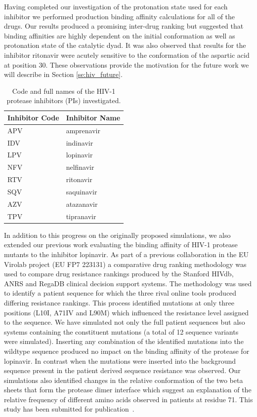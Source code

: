 \documentclass[a4paper,11pt]{article}
\begin{document}
Having completed our investigation 
of the protonation state used for each inhibitor we performed production binding affinity calculations 
for all of the drugs. Our results produced a promising inter-drug ranking but 
suggested that binding affinities are highly dependent on the initial conformation as well as protonation 
state of the catalytic dyad. It was also observed that results for the inhibitor ritonavir were acutely 
sensitive to the conformation of the aspartic acid at position 30. These observations provide the 
motivation for the future work we will describe in Section \ref{se:hiv_future}.

\begin{table}
\begin{center}
\begin{tabular}{l l}
\textbf{Inhibitor Code} & \textbf{Inhibitor Name}\\
\hline
APV & amprenavir\\
IDV & indinavir\\
LPV & lopinavir\\
NFV & nelfinavir\\
RTV & ritonavir\\
SQV & saquinavir\\
AZV & atazanavir \\
TPV & tipranavir \\
\hline
\end{tabular}
\end{center}
\caption{Code and full names of the HIV-1 protease inhibitors (PIs) investigated.}
\label{tab:inhibitors}
\end{table}

In addition to this progress on the originally proposed simulations, we also extended our previous work 
evaluating the binding affinity of HIV-1 protease mutants to the inhibitor lopinavir. As part of 
a previous collaboration in the EU Virolab project (EU FP7 223131) a comparative drug ranking 
methodology was used to compare drug resistance rankings produced by the Stanford HIVdb, ANRS 
and RegaDB clinical decision support systems. The methodology was used to identify a patient 
sequence for which the three rival online tools produced differing resistance rankings. This process 
identified mutations at only three positions (L10I, A71IV and L90M) which influenced the resistance 
level assigned to the sequence. We have simulated not only the full patient sequences but also 
systems containing the constituent mutations (a total of 12 sequence variants were simulated). 
Inserting any combination of the identified mutations into the wildtype sequence produced no impact 
on the binding affinity of the protease for lopinavir. In contrast when the mutations were inserted 
into the background sequence present in the patient derived sequence resistance was observed. Our 
simulations also identified changes in the relative conformation of the two beta sheets that form 
the protease dimer interface which suggest an explanation of the relative frequency of different 
amino acids observed in patients at residue 71. This study has been submitted for publication~\cite{Owain2011}.
\end{document}
